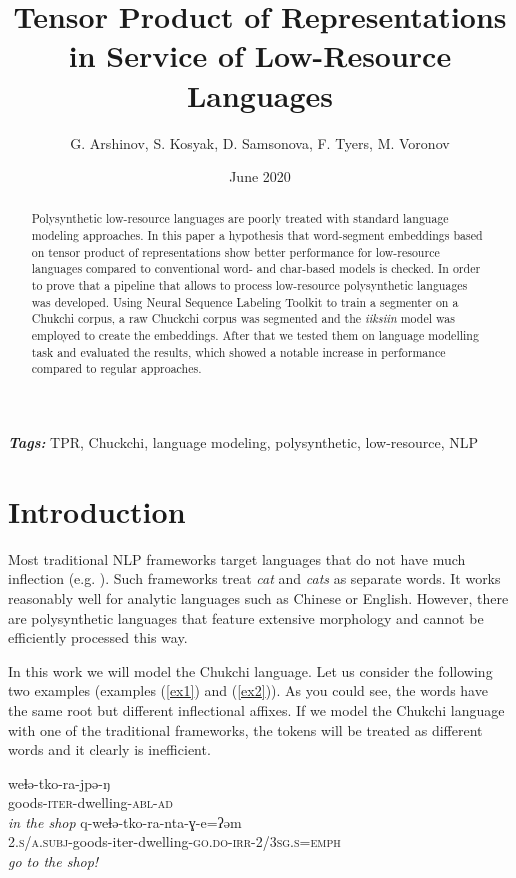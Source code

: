 \documentclass[leqno]{article}
\title{Tensor Product of Representations in Service of Low-Resource Languages}
\author{G. Arshinov, S. Kosyak, D. Samsonova, F. Tyers, M. Voronov}
\date{June 2020}
\providecommand{\keywords}[1]{\textbf{\textit{Tags: }} #1}
\begin{document}
\maketitle

\begin{abstract}
Polysynthetic low-resource languages are poorly treated with standard language modeling approaches. In this paper a hypothesis that word-segment embeddings based on tensor product of representations show better performance for low-resource languages compared to conventional word- and char-based models is checked. In order to prove that a pipeline that allows to process low-resource polysynthetic languages was developed. Using Neural Sequence Labeling Toolkit \parencite{yang2018ncrf} to train a segmenter on a Chukchi corpus, a raw Chuckchi corpus was segmented and the \textit{iiksiin} \parencite{iiksiin} model was employed to create the embeddings. After that we tested them on language modelling task and evaluated the results, which showed a notable increase in performance compared to regular approaches.
\end{abstract}

\keywords{TPR, Chuckchi, language modeling, polysynthetic, low-resource, NLP} 

\section{Introduction}

Most traditional NLP frameworks target languages that do not have
much inflection (e.g. \parencite{word2vec}).
Such frameworks treat \textit{cat} and \textit{cats} as separate words. It works reasonably well for analytic languages such as Chinese or English. However, there are polysynthetic languages that feature extensive
morphology and cannot be efficiently processed this way.

In this work we will model the Chukchi language. Let us consider the
following two examples
(examples (\ref{ex1}) and (\ref{ex2})). As you could see, the words
have the same root but different inflectional affixes.
If we model the Chukchi language with one of the traditional
frameworks, the tokens will be treated as different words and it
clearly is inefficient.

\begin{exe}
    \ex \label{ex1}
    \gll weɬə-tko-ra-jpə-ŋ \\
    goods-\textsc{iter}-dwelling-\textsc{abl}-\textsc{ad}\\
    \glt \textit{in the shop}
    \ex \label{ex2}
    \gll q-weɬə-tko-ra-nta-ɣ-e=ʔəm \\
    \textsc{2.s/a.subj}-goods-{iter}-dwelling-\textsc{go.do-irr-2/3sg.s=emph} \\
    \glt \textit{go to the shop!}
\end{exe}
\end{document}
